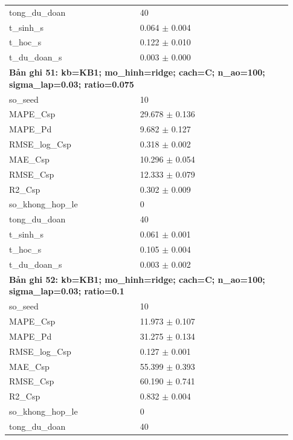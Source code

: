 \begin{longtable}{p{0.43\linewidth}p{0.50\linewidth}}
tong\_\allowbreak du\_\allowbreak doan & 40 \\
t\_\allowbreak sinh\_\allowbreak s & 0.064 $\pm$ 0.004 \\
t\_\allowbreak hoc\_\allowbreak s & 0.122 $\pm$ 0.010 \\
t\_\allowbreak du\_\allowbreak doan\_\allowbreak s & 0.003 $\pm$ 0.000 \\
\midrule
\multicolumn{2}{p{0.95\linewidth}}{\textbf{Bản ghi 51: kb=KB1; mo\_hinh=ridge; cach=C; n\_ao=100; sigma\_lap=0.03; ratio=0.075}} \\
so\_\allowbreak seed & 10 \\
MAPE\_\allowbreak Csp & 29.678 $\pm$ 0.136 \\
MAPE\_\allowbreak Pd & 9.682 $\pm$ 0.127 \\
RMSE\_\allowbreak log\_\allowbreak Csp & 0.318 $\pm$ 0.002 \\
MAE\_\allowbreak Csp & 10.296 $\pm$ 0.054 \\
RMSE\_\allowbreak Csp & 12.333 $\pm$ 0.079 \\
R2\_\allowbreak Csp & 0.302 $\pm$ 0.009 \\
so\_\allowbreak khong\_\allowbreak hop\_\allowbreak le & 0 \\
tong\_\allowbreak du\_\allowbreak doan & 40 \\
t\_\allowbreak sinh\_\allowbreak s & 0.061 $\pm$ 0.001 \\
t\_\allowbreak hoc\_\allowbreak s & 0.105 $\pm$ 0.004 \\
t\_\allowbreak du\_\allowbreak doan\_\allowbreak s & 0.003 $\pm$ 0.002 \\
\midrule
\multicolumn{2}{p{0.95\linewidth}}{\textbf{Bản ghi 52: kb=KB1; mo\_hinh=ridge; cach=C; n\_ao=100; sigma\_lap=0.03; ratio=0.1}} \\
so\_\allowbreak seed & 10 \\
MAPE\_\allowbreak Csp & 11.973 $\pm$ 0.107 \\
MAPE\_\allowbreak Pd & 31.275 $\pm$ 0.134 \\
RMSE\_\allowbreak log\_\allowbreak Csp & 0.127 $\pm$ 0.001 \\
MAE\_\allowbreak Csp & 55.399 $\pm$ 0.393 \\
RMSE\_\allowbreak Csp & 60.190 $\pm$ 0.741 \\
R2\_\allowbreak Csp & 0.832 $\pm$ 0.004 \\
so\_\allowbreak khong\_\allowbreak hop\_\allowbreak le & 0 \\
tong\_\allowbreak du\_\allowbreak doan & 40 \\

\end{longtable}
